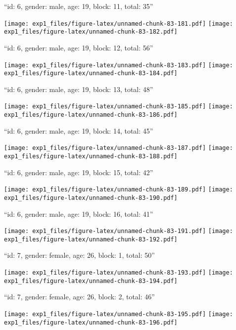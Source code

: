 \documentclass[11pt,,]{article}
\begin{document}
\newpage
[1] 

``id: 6, gender: male, age: 19, block: 11, total: 35''

\texttt{[image: exp1\_files/figure-latex/unnamed-chunk-83-181.pdf]}
\texttt{[image: exp1\_files/figure-latex/unnamed-chunk-83-182.pdf]}

\newpage
[1] 

``id: 6, gender: male, age: 19, block: 12, total: 56''

\texttt{[image: exp1\_files/figure-latex/unnamed-chunk-83-183.pdf]}
\texttt{[image: exp1\_files/figure-latex/unnamed-chunk-83-184.pdf]}

\newpage
[1] 

``id: 6, gender: male, age: 19, block: 13, total: 48''

\texttt{[image: exp1\_files/figure-latex/unnamed-chunk-83-185.pdf]}
\texttt{[image: exp1\_files/figure-latex/unnamed-chunk-83-186.pdf]}

\newpage
[1] 

``id: 6, gender: male, age: 19, block: 14, total: 45''

\texttt{[image: exp1\_files/figure-latex/unnamed-chunk-83-187.pdf]}
\texttt{[image: exp1\_files/figure-latex/unnamed-chunk-83-188.pdf]}

\newpage
[1] 

``id: 6, gender: male, age: 19, block: 15, total: 42''

\texttt{[image: exp1\_files/figure-latex/unnamed-chunk-83-189.pdf]}
\texttt{[image: exp1\_files/figure-latex/unnamed-chunk-83-190.pdf]}

\newpage
[1] 

``id: 6, gender: male, age: 19, block: 16, total: 41''

\texttt{[image: exp1\_files/figure-latex/unnamed-chunk-83-191.pdf]}
\texttt{[image: exp1\_files/figure-latex/unnamed-chunk-83-192.pdf]}

\newpage
[1] 

``id: 7, gender: female, age: 26, block: 1, total: 50''

\texttt{[image: exp1\_files/figure-latex/unnamed-chunk-83-193.pdf]}
\texttt{[image: exp1\_files/figure-latex/unnamed-chunk-83-194.pdf]}

\newpage
[1] 

``id: 7, gender: female, age: 26, block: 2, total: 46''

\texttt{[image: exp1\_files/figure-latex/unnamed-chunk-83-195.pdf]}
\texttt{[image: exp1\_files/figure-latex/unnamed-chunk-83-196.pdf]}
\end{document}
